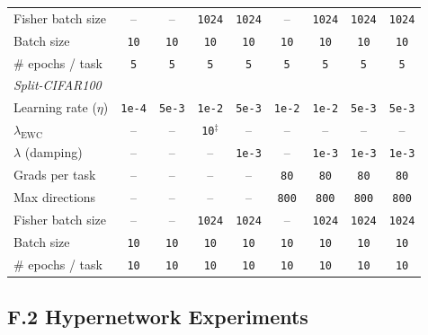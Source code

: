 \begin{table}[H]
{\begin{tabular}{lcccccccc}
Fisher batch size          & --    & --   & \texttt{1024} & \texttt{1024} & --    & \texttt{1024}  & \texttt{1024}  & \texttt{1024}  \\
Batch size                 & \texttt{10}    & \texttt{10}   & \texttt{10}   & \texttt{10}   & \texttt{10}    & \texttt{10}    & \texttt{10}    & \texttt{10}    \\
\# epochs / task           & \texttt{5}     & \texttt{5}    & \texttt{5}    & \texttt{5}    & \texttt{5}     & \texttt{5}     & \texttt{5}     & \texttt{5}     \\
\midrule
\multicolumn{9}{l}{\textit{Split-CIFAR100}} \\
\midrule
Learning rate ($\eta$)     & \texttt{1e-4}  & \texttt{5e-3} & \texttt{1e-2} & \texttt{5e-3} & \texttt{1e-2}  & \texttt{1e-2}  & \texttt{5e-3}  & \texttt{5e-3}  \\
$\lambda_{\mathrm{EWC}}$   & --    & --   & \texttt{10}$^\ddagger$ & -- & -- & --  & --    & --    \\
$\lambda$ (damping)        & --    & --   & --   & \texttt{1e-3} & --    & \texttt{1e-3}  & \texttt{1e-3}  & \texttt{1e-3}  \\
Grads per task             & --    & --   & --   & --   & \texttt{80}    & \texttt{80}    & \texttt{80}    & \texttt{80}    \\
Max directions             & --    & --   & --   & --   & \texttt{800}   & \texttt{800}   & \texttt{800}   & \texttt{800}   \\
Fisher batch size          & --    & --   & \texttt{1024} & \texttt{1024} & --    & \texttt{1024}  & \texttt{1024}  & \texttt{1024}  \\
Batch size                 & \texttt{10}    & \texttt{10}   & \texttt{10}   & \texttt{10}   & \texttt{10}    & \texttt{10}    & \texttt{10}    & \texttt{10}    \\
\# epochs / task           & \texttt{10}    & \texttt{10}   & \texttt{10}   & \texttt{10}   & \texttt{10}    & \texttt{10}    & \texttt{10}    & \texttt{10}    \\
\bottomrule
\end{tabular}}
\end{table}

\subsection*{F.2 \quad Hypernetwork Experiments}
\label{app:hyperparameters_hn}

